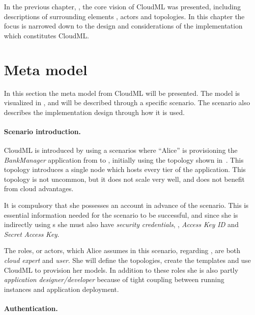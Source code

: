 
In the previous chapter, , the core vision of CloudML was presented,
including descriptions of surrounding elements \eg, actors and topologies.
In this chapter the focus is narrowed down to the design and considerations 
of the implementation which constitutes CloudML.

\section{Meta model}

In this section the meta model from CloudML will be presented.
The model is visualized in , and will be described through a specific scenario.
The scenario also describes the implementation design through how it is used.

\paragraph{Scenario introduction.}

CloudML is introduced by using a scenarios where ``Alice'' is provisioning the 
\emph{BankManager} application from  to ,
initially using the topology shown in~.
This topology introduces a single node which hosts every tier of the application.
This topology is not uncommon, but it does not scale very well, 
and does not benefit from cloud advantages.

It is compulsory that she possesses an  account in advance of the scenario.
This is essential information needed for the scenario to be successful,
and since she is indirectly using  s 
she must also have \emph{security credentials},
\ie, \emph{Access Key ID} and \emph{Secret Access Key}.

The roles, or actors, which Alice assumes in this scenario, regarding ,
are both \emph{cloud expert} and \emph{user}.
She will define the topologies, create the templates and use CloudML to provision her models.
In addition to these roles she is also partly \emph{application designer/developer}
because of tight coupling between running instances and application deployment.

\paragraph{Authentication.}

